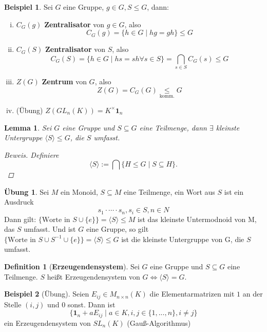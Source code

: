 \documentclass[a4paper]{article}
\theoremstyle{plain}
\newtheorem{lemm}[thm]{Lemma}
\theoremstyle{definition}
\newtheorem{defi}[thm]{Definition}
\newtheorem*{bsp*}{Beispiel}
\newtheorem{ubng}[thm]{Übung}
\begin{document}
\begin{bsp*}
  Sei $G$ eine Gruppe, $g  \in G, S \le G$, dann:
  \begin{enumerate}[(i)] %
\item $C_{G}(g)$ \textbf{Zentralisator} von $g \in G$, also $$C_{G}(g) = \{h \in G \mid hg = gh\} \le G$$
\item $C_{G}(S)$ \textbf{Zentralisator} von $S$, also $$C_{G}(S) = \{h \in G \mid hs = sh \forall s \in S\} = \bigcap_{s \in S} C_{G}(s) \le G$$
\item $Z(G)$ \textbf{Zentrum} von $G$, also $$Z(G)=C_{G}(G) \underset{\text{komm.}}\le G$$
\item (Übung) $Z(GL_{n}(K)) = K^{\times}\mathbf{1}_{n}$
  \end{enumerate}

\end{bsp*}

\begin{lemm}
  Sei $G$ eine Gruppe und $S \subseteq G$ eine Teilmenge, dann $\exists$ kleinste Untergruppe $\langle S \rangle \le G$, die $S$ umfasst.
  \begin{proof}[Beweis]
    Definiere $$\langle S \rangle := \bigcap \{H \leq G \mid S \subseteq H\}.$$
  \end{proof}

\end{lemm}

\begin{ubng}
Sei $M$ ein Monoid, $S \subseteq M$ eine Teilmenge, ein Wort aus $S$ ist ein Ausdruck $$s_{1} \cdot \cdots \cdot s_{n}, s_{i} \in S, n\in N$$
Dann gilt: $\{\text{Worte in } S \cup \{e\}\} = \langle S \rangle \le M$ ist das kleinste Untermodnoid von M, das $S$ umfasst.
Und ist $G$ eine Gruppe, so gilt $\{\text{Worte in } S \cup S^{-1} \cup \{e\}\} = \langle S \rangle \le G$ ist die kleinste Untergruppe von G, die $S$ umfasst.
\end{ubng}

\begin{defi}[\textbf{Erzeugendensystem}]
Sei $G$ eine Gruppe und $S \subseteq G$ eine Teilmenge. $S$ heißt Erzeugendensystem von $G \iff \langle S \rangle = G$.
\end{defi}

\begin{bsp*}[Übung]
Seien $E_{ij} \in M_{n \times n}(K)$ die Elementarmatrizen mit $1$ an der Stelle $(i,j)$ und $0$ sonst. Dann ist
$$\{\mathbf 1_{n} + aE_{ij} \mid a \in K, i,j \in \{1, ..., n\}, i \neq j\}$$
ein Erzeugendensystem von $SL_{n}(K)$ (Gauß-Algorithmus)
\end{bsp*}
\end{document}
